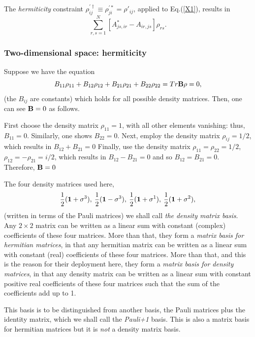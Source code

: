 \documentclass[aps,pra,twocolumn,amssymb, amsfonts,amsmath,showpacs, superscriptaddress]{revtex4}
\begin{document}
The \textit{hermiticity} constraint $\rho_{ij}^{'\dagger}\equiv\rho_{ji}^{'*}=\rho'_{ij}$, applied to  Eq.(\ref{X1}),  results in 
\begin{equation}\label{X2}
\sum_{r,s=1}^{N}[A_{js,ir}^{*}-A_{ir,js}]\rho_{rs}.
\end{equation}

\subsubsection{Two-dimensional space: hermiticity}

Suppose we have the equation
\[
B_{11}\rho_{11}+B_{12}\rho_{12}+B_{21}\rho_{21}+B_{22}\rho_{22}=Tr{\bf B}{\bf \rho}=0,
\] 
\noindent (the $B_{ij}$ are constants) which holds for all possible density matrices.  Then, one can see ${\bf B}=0$  as follows. 

First choose 
the density matrix $\rho_{11}=1$, with all other elements vanishing: thus,  $B_{11}=0$.  Similarly, one shows $B_{22}=0$. Next, employ the density matrix
$ \rho_{ij}=1/2$, which results in $B_{12}+B_{21}=0$  Finally, use the density matrix $\rho_{11}=\rho_{22}=1/2$, $\rho_{12}=-\rho_{21}=i/2$, which results in 
$B_{12}-B_{21}=0$ and so $B_{12}=B_{21}=0$. Therefore, ${\bf B}=0$

The four density matrices used here, 
\[
\frac{1}{2}({\bf 1}+ {\bf \sigma}^{3}), \medspace \frac{1}{2}({\bf 1}- {\bf \sigma}^{3}), \medspace \frac{1}{2}({\bf 1}+{\bf \sigma}^{1}),\medspace \frac{1}{2}({\bf 1}+{\bf \sigma}^{2}),
\]
\noindent (written in terms of the Pauli matrices)
we shall call \textit{the density matrix basis}.   Any $2\times2$ matrix can be written as a linear sum with constant (complex) coefficients of these four matrices. 
                               More than that, they form a \textit{matrix basis for hermitian matrices}, in that any hermitian matrix can be written as a linear sum with constant (real) coefficients of these four matrices. More than that, and this is the reason for their deployment here, they form a \textit{matrix basis for density matrices}, in that any density matrix can be written as a linear sum with constant positive real coefficients of these four matrices such that the sum of the coefficients add up to 1.  
                               
                               This basis is to be distinguished from another basis,  the Pauli matrices plus the identity matrix, which we shall call the \textit{Pauli+1} basis. This is also a matrix basis for hermitian matrices but it is \textit{not}   a density matrix basis. 
\end{document}
